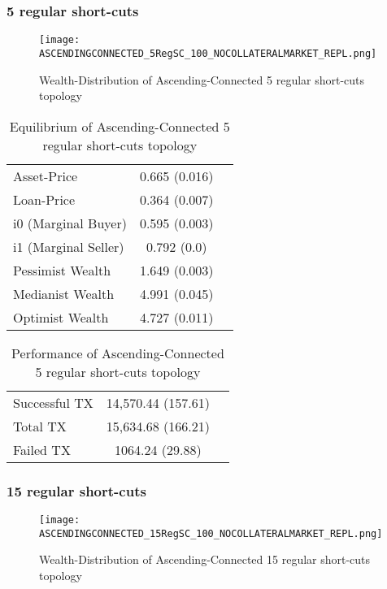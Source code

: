 \documentclass[Bachelorarbeit.tex]{subfiles}
\begin{document}
\subsubsection{5 regular short-cuts}
\begin{figure}[H]
	\centering
  \texttt{[image: ASCENDINGCONNECTED\_5RegSC\_100\_NOCOLLATERALMARKET\_REPL.png]}
	\caption{Wealth-Distribution of Ascending-Connected 5 regular short-cuts topology}
	\label{fig1}
\end{figure}

\begin{table}[H]
	\caption{Equilibrium of Ascending-Connected 5 regular short-cuts topology}
	\centering
	\begin{tabular} { l c r }
		\hline
		Asset-Price & 0.665 (0.016) \\
		Loan-Price & 0.364 (0.007) \\
		i0 (Marginal Buyer) & 0.595 (0.003) \\
		i1 (Marginal Seller) & 0.792 (0.0) \\
		Pessimist Wealth & 1.649 (0.003) \\
		Medianist Wealth & 4.991 (0.045) \\
		Optimist Wealth & 4.727 (0.011) \\
		\hline
	\end{tabular}
\end{table} 

\begin{table}[H]
	\caption{Performance of Ascending-Connected 5 regular short-cuts topology}
	\centering
	\begin{tabular} { l c r }
		\hline
		Successful TX & 14,570.44 (157.61) \\
		Total TX & 15,634.68 (166.21) \\
		Failed TX & 1064.24 (29.88) \\
		\hline
	\end{tabular}
\end{table}

\subsubsection{15 regular short-cuts}
\begin{figure}[H]
	\centering
  \texttt{[image: ASCENDINGCONNECTED\_15RegSC\_100\_NOCOLLATERALMARKET\_REPL.png]}
	\caption{Wealth-Distribution of Ascending-Connected 15 regular short-cuts topology}
	\label{fig1}
\end{figure}
\end{document}
